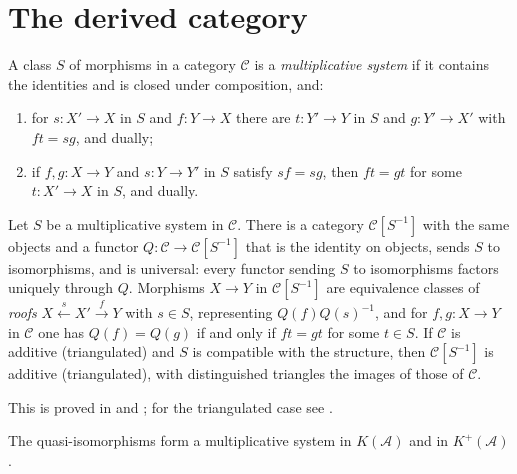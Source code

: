 \section{The derived category}\label{derived-categories:section-derived-category}

\begin{definition}\label{derived-categories:definition-multiplicative-system}
A class $S$ of morphisms in a category $\mathcal{C}$ is a \emph{multiplicative system} if it contains the identities and is closed
under composition, and:
\begin{enumerate}
\item for $s \colon X' \to X$ in $S$ and $f \colon Y \to X$ there are $t \colon Y' \to Y$ in $S$ and $g \colon Y' \to X'$ with $ft = sg$, and dually;
\item if $f, g \colon X \to Y$ and $s \colon Y \to Y'$ in $S$ satisfy $sf = sg$, then $ft = gt$ for some $t \colon X' \to X$ in $S$, and dually.
\end{enumerate}
\end{definition}

\begin{theorem}[Localisation]\label{derived-categories:theorem-localisation}
Let $S$ be a multiplicative system in $\mathcal{C}$. There is a category $\mathcal{C}[S^{-1}]$ with the same objects and a functor
$Q \colon \mathcal{C} \to \mathcal{C}[S^{-1}]$ that is the identity on objects, sends $S$ to isomorphisms, and is universal: every functor sending
$S$ to isomorphisms factors uniquely through $Q$. Morphisms $X \to Y$ in $\mathcal{C}[S^{-1}]$ are equivalence classes of \emph{roofs}
$X \xleftarrow{s} X' \xrightarrow{f} Y$ with $s \in S$, representing $Q(f)Q(s)^{-1}$, and for $f, g \colon X \to Y$ in $\mathcal{C}$ one has
$Q(f) = Q(g)$ if and only if $ft = gt$ for some $t \in S$. If $\mathcal{C}$ is additive (triangulated) and $S$ is compatible
with the structure, then $\mathcal{C}[S^{-1}]$ is additive (triangulated), with distinguished triangles the images of those of $\mathcal{C}$.
\end{theorem}

This is proved in \cite[Chapter III]{gelfand-manin} and \cite[Chapter 7]{kashiwara-schapira}; for the triangulated case see
\cite[Section 10.3]{weibel-homological}.

\begin{proposition}\label{derived-categories:proposition-qis-multiplicative}
The quasi-isomorphisms form a multiplicative system in $K(\mathcal{A})$ and in $K^+(\mathcal{A})$.
\end{proposition}

